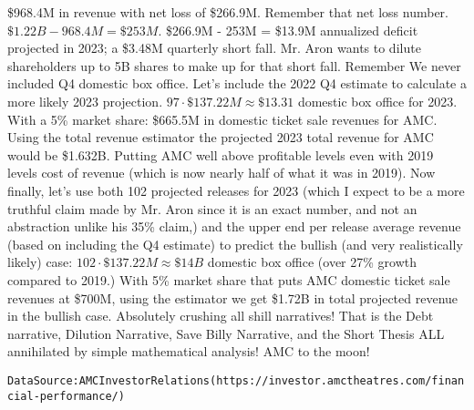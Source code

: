\documentclass{article}
\begin{document}
\$968.4M in 
revenue with net loss of \$266.9M. Remember that net loss number. 
$\$1.22B - 968.4M = \$253M$. 
\$266.9M - 253M = \$13.9M annualized deficit projected in 2023; a \$3.48M 
quarterly short fall. Mr. Aron wants to dilute shareholders up to 5B shares to 
make up for that short fall. Remember We never included Q4 domestic box office. 
Let's include the 2022 Q4 estimate to calculate a more likely 2023 projection. 
$97 \cdot \$137.22M \approx \$13.31$ domestic box office for 2023. With a 5\% 
market share: \$665.5M in domestic ticket sale revenues for AMC. Using the total 
revenue estimator the projected 2023 
total revenue for AMC would be \$1.632B. Putting AMC well above profitable levels
even with 2019 levels cost of revenue (which is now nearly half of what it was 
in 2019). Now finally, let's use both 102 projected releases for 2023 (which I 
expect to be 
a more truthful claim made by Mr. Aron since it is an exact number, and not an 
abstraction unlike his 35\% claim,) and the 
upper end per release average revenue (based on including the Q4 estimate) to 
predict the bullish (and very realistically likely) case: 
$102 \cdot \$137.22M \approx \$14B$ domestic box office (over 27\% growth compared 
to 2019.) With 5\% market share that puts AMC domestic ticket sale revenues at
\$700M, using the estimator we get \$1.72B in total projected revenue in the 
bullish case. Absolutely crushing all shill narratives! That is the Debt
narrative, Dilution Narrative, Save Billy Narrative, and the Short Thesis ALL 
annihilated by simple mathematical analysis! AMC to the moon!
\begin{alltt}

    
Data Source: AMC Investor Relations (https://investor.amctheatres.com/financial-performance/)
\end{alltt}
\end{document}

